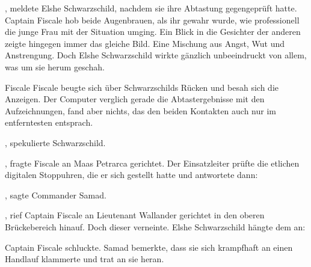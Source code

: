 , meldete Elshe Schwarzschild, nachdem sie ihre Abtastung gegengeprüft hatte. Captain Fiscale hob beide Augenbrauen, als ihr gewahr wurde, wie professionell die junge Frau mit der Situation umging. Ein Blick in die Gesichter der anderen zeigte hingegen immer das gleiche Bild. Eine Mischung aus Angst, Wut und Anstrengung. Doch Elshe Schwarzschild wirkte gänzlich unbeeindruckt von allem, was um sie herum geschah.

\par

Fiscale Fiscale beugte sich über Schwarzschilds Rücken und besah sich die Anzeigen. Der Computer verglich gerade die Abtastergebnisse mit den Aufzeichnungen, fand aber nichts, das den beiden Kontakten auch nur im entferntesten entsprach.

\par

, spekulierte Schwarzschild. 

\par

, fragte Fiscale an Maas Petrarca gerichtet. Der Einsatzleiter prüfte die etlichen digitalen Stoppuhren, die er sich gestellt hatte und antwortete dann: 

\par

, sagte Commander Samad.

\par

, rief Captain Fiscale an Lieutenant Wallander gerichtet in den oberen Brückebereich hinauf. Doch dieser verneinte. Elshe Schwarzschild hängte dem an: 

\par

Captain Fiscale schluckte. Samad bemerkte, dass sie sich krampfhaft an einen Handlauf klammerte und trat an sie heran. 

